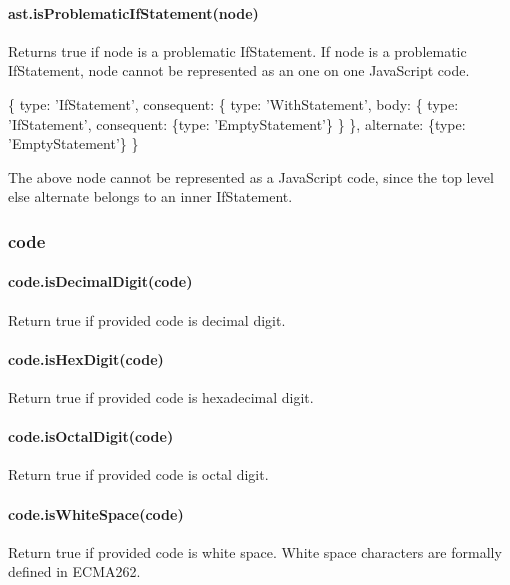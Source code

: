 \paragraph*{ast.\+is\+Problematic\+If\+Statement(node)}

Returns true if {\ttfamily node} is a problematic If\+Statement. If {\ttfamily node} is a problematic {\ttfamily If\+Statement}, {\ttfamily node} cannot be represented as an one on one Java\+Script code. 
\begin{DoxyCode}
\{
    type: 'IfStatement',
    consequent: \{
        type: 'WithStatement',
        body: \{
            type: 'IfStatement',
            consequent: \{type: 'EmptyStatement'\}
        \}
    \},
    alternate: \{type: 'EmptyStatement'\}
\}
\end{DoxyCode}
 The above node cannot be represented as a Java\+Script code, since the top level {\ttfamily else} alternate belongs to an inner {\ttfamily If\+Statement}.

\subsubsection*{code}

\paragraph*{code.\+is\+Decimal\+Digit(code)}

Return true if provided code is decimal digit.

\paragraph*{code.\+is\+Hex\+Digit(code)}

Return true if provided code is hexadecimal digit.

\paragraph*{code.\+is\+Octal\+Digit(code)}

Return true if provided code is octal digit.

\paragraph*{code.\+is\+White\+Space(code)}

Return true if provided code is white space. White space characters are formally defined in E\+C\+M\+A262.

